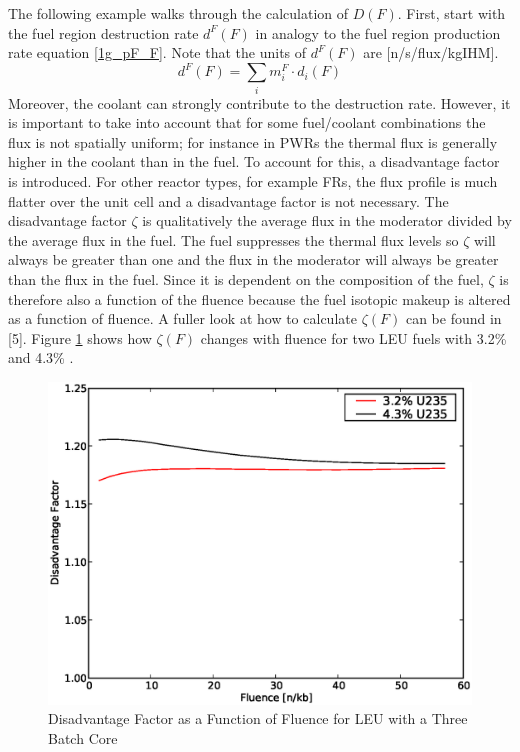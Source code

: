 The following example walks through the calculation of $D(F)$.  First, start with the fuel region 
destruction rate $d^F(F)$ in analogy to the fuel region production rate equation \ref{1g_pF_F}.  Note that the 
units of $d^F(F)$ are [n/s/flux/kgIHM].  
\begin{equation}
\label{1g_dF_F}
d^F(F) = \sum_i m_i^F \cdot d_i(F)
\end{equation}
Moreover, the coolant can strongly contribute to the destruction rate.  However, it is 
important to take into account that for some fuel/coolant combinations the flux is not 
spatially uniform; for instance in PWRs the thermal flux is generally higher in the coolant 
than in the fuel. To account for this, a disadvantage factor is introduced.  For other reactor 
types, for example FRs, the flux profile is much flatter over the unit cell and a disadvantage 
factor is not necessary. The disadvantage factor $\zeta$ is qualitatively the average flux in 
the moderator divided by the average flux in the fuel. The fuel suppresses the thermal flux 
levels so $\zeta$ will always be greater than one and the flux in the moderator will always 
be greater than the flux in the fuel. Since it is dependent on the composition of the fuel, $\zeta$ 
is therefore also a function of the fluence because the fuel isotopic makeup is altered as a function 
of fluence. A fuller look at how to calculate $\zeta(F)$ can be found in [5].  Figure \ref{1g_fig04} 
shows how $\zeta(F)$ changes with fluence for two LEU fuels with 3.2\% and 4.3\% . 
\begin{figure}[htbp]
\caption{Disadvantage Factor as a Function of Fluence for LEU with a Three Batch Core}
\label{1g_fig04}
\begin{center}
\includegraphics[scale=0.5]{one_group_method/figs/Fig04.eps}
\end{center}
\end{figure}
